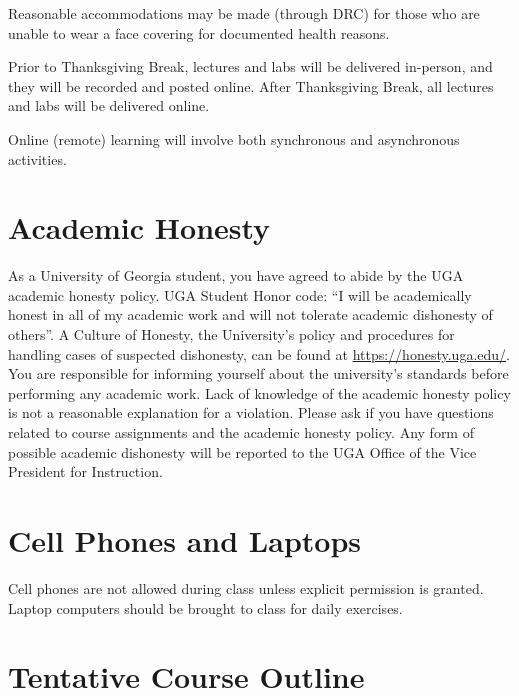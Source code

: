 \documentclass[12pt]{article}
\begin{document}
Reasonable accommodations may be made (through DRC) for those who are
unable to wear a face covering for documented health reasons. 

Prior to Thanksgiving Break, lectures and labs will be delivered
in-person, and they will be recorded and posted online. After
Thanksgiving Break, all lectures and labs will be delivered online. 

Online (remote) learning will involve both synchronous and
asynchronous activities.

\vspace{-2mm}
\section*{\normalsize Academic Honesty}
\vspace{-4mm}
As a University of Georgia student, you have agreed to abide by the
UGA academic honesty policy. UGA Student Honor code: “I will be
academically honest in all of my academic work and will not tolerate
academic dishonesty of others”. A Culture of Honesty, the University's
policy and procedures for handling cases of suspected dishonesty, can
be found at \url{https://honesty.uga.edu/}. You are responsible for
informing yourself about the university’s standards before performing
any academic work. Lack of knowledge of the academic honesty policy is
not a reasonable explanation for a violation. Please ask if you have
questions related to course assignments and the academic honesty
policy. Any form of possible academic dishonesty will be reported to
the UGA Office of the Vice President for Instruction.


\vspace{-2mm}
\section*{\normalsize Cell Phones and Laptops}
\vspace{-4mm}
Cell phones are not allowed during class unless explicit permission is
granted. Laptop computers should be brought to class for daily
exercises.



\section*{\normalsize Tentative Course Outline}
\vspace{-6mm}
\end{document}
